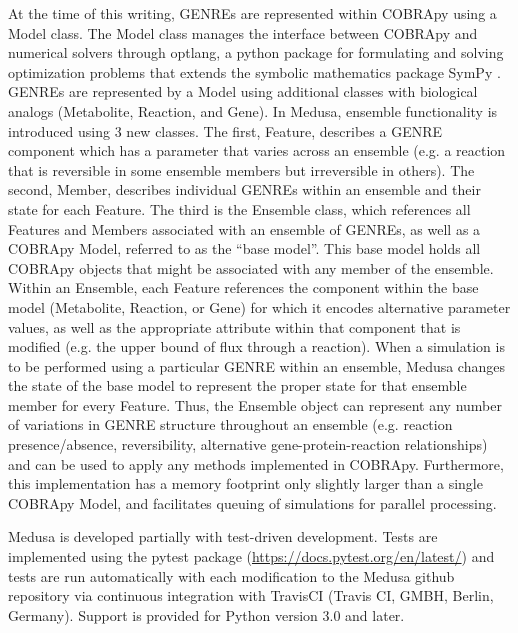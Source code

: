 \documentclass[11pt,onecolumn,notitlepage,openany,twoside]{book}
\begin{document}
\begin{refsection}
At the time of this writing, GENREs are represented within COBRApy using a Model class. The Model class manages the interface between COBRApy and numerical solvers through optlang, a python package for formulating and solving optimization problems that extends the symbolic mathematics package SymPy \cite{Jensen2016-nu,Meurer2017-mu}. GENREs are represented by a Model using additional classes with biological analogs (Metabolite, Reaction, and Gene). In Medusa, ensemble functionality is introduced using 3 new classes. The first, Feature, describes a GENRE component which has a parameter that varies across an ensemble (e.g. a reaction that is reversible in some ensemble members but irreversible in others). The second, Member, describes individual GENREs within an ensemble and their state for each Feature. The third is the Ensemble class, which references all Features and Members associated with an ensemble of GENREs, as well as a COBRApy Model, referred to as the “base model”. This base model holds all COBRApy objects that might be associated with any member of the ensemble. Within an Ensemble, each Feature references the component within the base model (Metabolite, Reaction, or Gene) for which it encodes alternative parameter values, as well as the appropriate attribute within that component that is modified (e.g. the upper bound of flux through a reaction). When a simulation is to be performed using a particular GENRE within an ensemble, Medusa changes the state of the base model to represent the proper state for that ensemble member for every Feature. Thus, the Ensemble object can represent any number of variations in GENRE structure throughout an ensemble (e.g. reaction presence/absence, reversibility, alternative gene-protein-reaction relationships) and can be used to apply any methods implemented in COBRApy. Furthermore, this implementation has a memory footprint only slightly larger than a single COBRApy Model, and facilitates queuing of simulations for parallel processing.

Medusa is developed partially with test-driven development. Tests are implemented using the pytest package (\url{https://docs.pytest.org/en/latest/}) and tests are run automatically with each modification to the Medusa github repository via continuous integration with TravisCI (Travis CI, GMBH, Berlin, Germany). Support is provided for Python version 3.0 and later.


\end{refsection}
\end{document}
